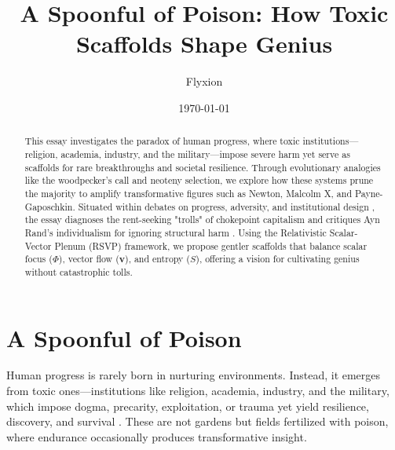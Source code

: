\documentclass[12pt]{article}
\begin{document}
\title{A Spoonful of Poison: How Toxic Scaffolds Shape Genius}
\author{Flyxion}
\date{\today}
\maketitle

\begin{abstract}
This essay investigates the paradox of human progress, where toxic institutions---religion, academia, industry, and the military---impose severe harm yet serve as scaffolds for rare breakthroughs and societal resilience. Through evolutionary analogies like the woodpecker’s call and neoteny selection, we explore how these systems prune the majority to amplify transformative figures such as Newton, Malcolm X, and Payne-Gaposchkin. Situated within debates on progress, adversity, and institutional design \citep{graeber2021dawn, henrich2016secret}, the essay diagnoses the rent-seeking "trolls" of chokepoint capitalism \citep{giblin2022chokepoint, zuboff2019age} and critiques Ayn Rand’s individualism for ignoring structural harm \citep{rand1957atlas, burns2009goddess}. Using the Relativistic Scalar-Vector Plenum (RSVP) framework, we propose gentler scaffolds that balance scalar focus ($\Phi$), vector flow ($\mathbf{v}$), and entropy ($S$), offering a vision for cultivating genius without catastrophic tolls.
\end{abstract}

\section{A Spoonful of Poison}
Human progress is rarely born in nurturing environments. Instead, it emerges from toxic ones---institutions like religion, academia, industry, and the military, which impose dogma, precarity, exploitation, or trauma yet yield resilience, discovery, and survival \citep{graeber2021dawn, henrich2016secret}. These are not gardens but fields fertilized with poison, where endurance occasionally produces transformative insight.
\end{document}
